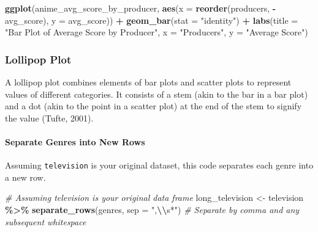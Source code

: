 \documentclass[
]{book}
\newenvironment{Shaded}{\begin{snugshade}}{\end{snugshade}}
\newcommand{\AttributeTok}[1]{\textcolor[rgb]{0.13,0.29,0.53}{#1}}
\newcommand{\CommentTok}[1]{\textcolor[rgb]{0.56,0.35,0.01}{\textit{#1}}}
\newcommand{\FunctionTok}[1]{\textcolor[rgb]{0.13,0.29,0.53}{\textbf{#1}}}
\newcommand{\NormalTok}[1]{#1}
\newcommand{\OtherTok}[1]{\textcolor[rgb]{0.56,0.35,0.01}{#1}}
\newcommand{\SpecialCharTok}[1]{\textcolor[rgb]{0.81,0.36,0.00}{\textbf{#1}}}
\newcommand{\StringTok}[1]{\textcolor[rgb]{0.31,0.60,0.02}{#1}}
\begin{document}
\begin{Shaded}
\begin{Highlighting}[]
\FunctionTok{ggplot}\NormalTok{(anime\_avg\_score\_by\_producer, }\FunctionTok{aes}\NormalTok{(}\AttributeTok{x =} \FunctionTok{reorder}\NormalTok{(producers, }\SpecialCharTok{{-}}\NormalTok{avg\_score), }\AttributeTok{y =}\NormalTok{ avg\_score)) }\SpecialCharTok{+}
  \FunctionTok{geom\_bar}\NormalTok{(}\AttributeTok{stat =} \StringTok{"identity"}\NormalTok{) }\SpecialCharTok{+}
  \FunctionTok{labs}\NormalTok{(}\AttributeTok{title =} \StringTok{"Bar Plot of Average Score by Producer"}\NormalTok{,}
       \AttributeTok{x =} \StringTok{"Producers"}\NormalTok{,}
       \AttributeTok{y =} \StringTok{"Average Score"}\NormalTok{)}
\end{Highlighting}
\end{Shaded}

\subsubsection*{Lollipop Plot}\label{lollipop-plot}

A lollipop plot combines elements of bar plots and scatter plots to represent values of different categories. It consists of a stem (akin to the bar in a bar plot) and a dot (akin to the point in a scatter plot) at the end of the stem to signify the value (Tufte, 2001).

\paragraph*{Separate Genres into New Rows}\label{separate-genres-into-new-rows}

Assuming \texttt{television} is your original dataset, this code separates each genre into a new row.

\begin{Shaded}
\begin{Highlighting}[]
\CommentTok{\# Assuming \textasciigrave{}television\textasciigrave{} is your original data frame}
\NormalTok{long\_television }\OtherTok{\textless{}{-}}\NormalTok{ television }\SpecialCharTok{\%\textgreater{}\%}
  \FunctionTok{separate\_rows}\NormalTok{(genres, }\AttributeTok{sep =} \StringTok{",}\SpecialCharTok{\textbackslash{}\textbackslash{}}\StringTok{s*"}\NormalTok{)  }\CommentTok{\# Separate by comma and any subsequent whitespace}
\end{Highlighting}
\end{Shaded}
\end{document}
